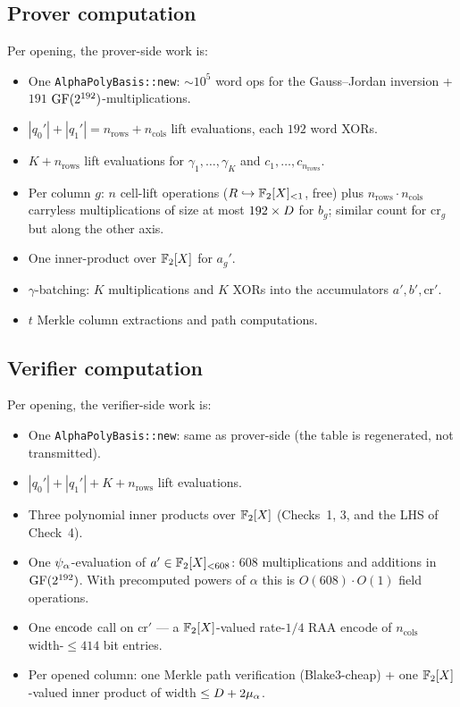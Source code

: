 \subsection{Prover computation}

Per opening, the prover-side work is:
\begin{itemize}[leftmargin=2em]
  \item One \texttt{AlphaPolyBasis::new}: $\sim 10^5$ word ops for
    the Gauss–Jordan inversion + $191$ $\mathrm{GF}(2^{192})$-multiplications.
  \item $|q_0'| + |q_1'| = n_{\mathrm{rows}} + n_{\mathrm{cols}}$
    lift evaluations, each $192$ word XORs.
  \item $K + n_{\mathrm{rows}}$ lift evaluations for
    $\gamma_1, \ldots, \gamma_K$ and $c_1, \ldots, c_{n_{\mathrm{rows}}}$.
  \item Per column $g$: $n$ cell-lift operations
    ($R \hookrightarrow \mathbb{F}_2[X]_{<1}$, free) plus
    $n_{\mathrm{rows}} \cdot n_{\mathrm{cols}}$ carryless multiplications
    of size at most $192 \times D$ for $b_g$; similar count for
    $\mathrm{cr}_g$ but along the other axis.
  \item One inner-product over $\mathbb{F}_2[X]$ for $a_g'$.
  \item $\gamma$-batching: $K$ multiplications and $K$ XORs into the
    accumulators $a', b', \mathrm{cr}'$.
  \item $t$ Merkle column extractions and path computations.
\end{itemize}

\subsection{Verifier computation}

Per opening, the verifier-side work is:
\begin{itemize}[leftmargin=2em]
  \item One \texttt{AlphaPolyBasis::new}: same as prover-side
    (the table is regenerated, not transmitted).
  \item $|q_0'| + |q_1'| + K + n_{\mathrm{rows}}$ lift evaluations.
  \item Three polynomial inner products over $\mathbb{F}_2[X]$ (Checks~1, 3,
    and the LHS of Check~4).
  \item One $\psi_{\alpha}$-evaluation of $a' \in \mathbb{F}_2[X]_{<608}$: $608$
    multiplications and additions in $\mathrm{GF}(2^{192})$. With precomputed powers
    of $\alpha$ this is $O(608) \cdot O(1)$ field operations.
  \item One $\operatorname{encode}$ call on $\mathrm{cr}'$ — a $\mathbb{F}_2[X]$-valued
    rate-$1/4$ RAA encode of $n_{\mathrm{cols}}$ width-$\le 414$ bit
    entries.
  \item Per opened column: one Merkle path verification (Blake3-cheap)
    + one $\mathbb{F}_2[X]$-valued inner product of width
    $\le D + 2 \mu_\alpha$.
\end{itemize}

